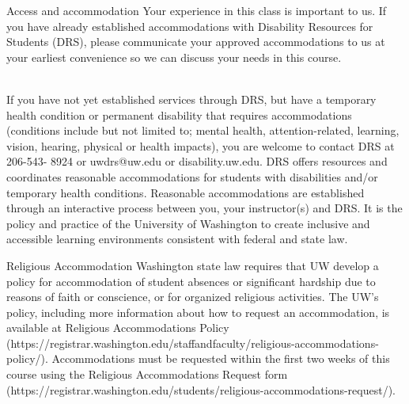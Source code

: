 \documentclass[10pt,t]{beamer}
\begin{document}
\begin{frame}{Access and accommodation}
\small Your experience in this class is important to us. If you have already established accommodations with Disability Resources for Students (DRS), please communicate your approved accommodations to us at your earliest convenience so we can discuss your needs in this course.
\\~\

\small If you have not yet established services through DRS, but have a temporary health condition or permanent disability that requires accommodations (conditions include but not limited to; mental health, attention-related, learning, vision, hearing, physical or health impacts), you are welcome to contact DRS at 206-543- 8924 or uwdrs@uw.edu or disability.uw.edu. DRS offers resources and coordinates reasonable accommodations for students with disabilities and/or temporary health conditions. Reasonable accommodations are established through an interactive process between you, your instructor(s) and DRS. It is the policy and practice of the University of Washington to create inclusive and accessible learning environments consistent with federal and state law.

\end{frame}

\begin{frame}{Religious Accommodation}
Washington state law requires that UW develop a policy for accommodation of student absences or significant hardship due to reasons of faith or conscience, or for organized religious activities. The UW’s policy, including more information about how to request an accommodation, is available at Religious Accommodations Policy (https://registrar.washington.edu/staffandfaculty/religious-accommodations-policy/). Accommodations must be requested within the first two weeks of this course using the Religious Accommodations Request form (https://registrar.washington.edu/students/religious-accommodations-request/).
\end{frame}
\end{document}
